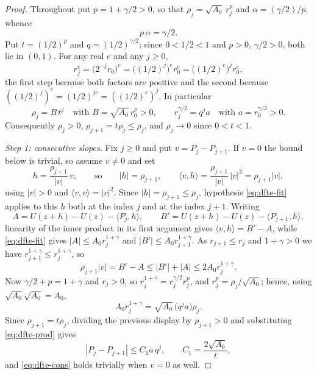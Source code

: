 \begin{proof}
Throughout put $p=1+\gamma/2>0$, so that $\rho_j=\sqrt{A_0}\,r_j^{p}$ and
$\alpha=(\gamma/2)/p$, whence
\begin{equation}\label{eq:dfte-exponent}
  p\,\alpha=\gamma/2 .
\end{equation}
Put $t=(1/2)^{p}$ and $q=(1/2)^{\gamma/2}$; since $0<1/2<1$ and $p>0$,
$\gamma/2>0$, both lie in $(0,1)$. For any real $e$ and any $j\ge0$,
\[
  r_j^{e}=\bigl(2^{-j}r_0\bigr)^{e}=\bigl((1/2)^{j}\bigr)^{e}r_0^{e}
   =\bigl((1/2)^{e}\bigr)^{j}r_0^{e},
\]
the first step because both factors are positive and the second because
$((1/2)^j)^e=(1/2)^{je}=((1/2)^e)^j$. In particular
\begin{equation}\label{eq:dfte-geom}
  \rho_j=B\,t^{j}\quad\text{with }B=\sqrt{A_0}\,r_0^{p}>0,
  \qquad r_j^{\gamma/2}=q^{j}a\quad\text{with }a=r_0^{\gamma/2}>0 .
\end{equation}
Consequently $\rho_j>0$, $\rho_{j+1}=t\rho_j\le\rho_j$, and $\rho_j\to0$ since
$0<t<1$.

\emph{Step 1: consecutive slopes.}
Fix $j\ge0$ and put $v=P_j-P_{j+1}$. If $v=0$ the bound below is trivial, so
assume $v\ne0$ and set
\[
  h=\frac{\rho_{j+1}}{|v|}\,v,\qquad\text{so}\qquad |h|=\rho_{j+1},
  \qquad \langle v,h\rangle=\frac{\rho_{j+1}}{|v|}\,|v|^2=\rho_{j+1}|v| ,
\]
using $|v|>0$ and $\langle v,v\rangle=|v|^2$. Since $|h|=\rho_{j+1}\le\rho_j$,
hypothesis \eqref{eq:dfte-fit} applies to this $h$ both at the index $j$ and at
the index $j+1$. Writing
\[
  A=U(z+h)-U(z)-\langle P_j,h\rangle,\qquad
  B'=U(z+h)-U(z)-\langle P_{j+1},h\rangle,
\]
linearity of the inner product in its first argument gives
$\langle v,h\rangle=B'-A$, while \eqref{eq:dfte-fit} gives $|A|\le A_0r_j^{1+\gamma}$
and $|B'|\le A_0r_{j+1}^{1+\gamma}$. As $r_{j+1}\le r_j$ and $1+\gamma>0$ we have
$r_{j+1}^{1+\gamma}\le r_j^{1+\gamma}$, so
\[
  \rho_{j+1}|v|=B'-A\le|B'|+|A|\le2A_0r_j^{1+\gamma}.
\]
Now $\gamma/2+p=1+\gamma$ and $r_j>0$, so
$r_j^{1+\gamma}=r_j^{\gamma/2}r_j^{p}$, and $r_j^{p}=\rho_j/\sqrt{A_0}$; hence,
using $\sqrt{A_0}\sqrt{A_0}=A_0$,
\begin{equation}\label{eq:dfte-prod}
  A_0r_j^{1+\gamma}=\sqrt{A_0}\,\bigl(q^{j}a\bigr)\rho_j .
\end{equation}
Since $\rho_{j+1}=t\rho_j$, dividing the previous display by $\rho_{j+1}>0$ and
substituting \eqref{eq:dfte-prod} gives
\begin{equation}\label{eq:dfte-cons}
  |P_j-P_{j+1}|\le C_1a\,q^{j},\qquad C_1=\frac{2\sqrt{A_0}}{t} ,
\end{equation}
and \eqref{eq:dfte-cons} holds trivially when $v=0$ as well.


\end{proof}
